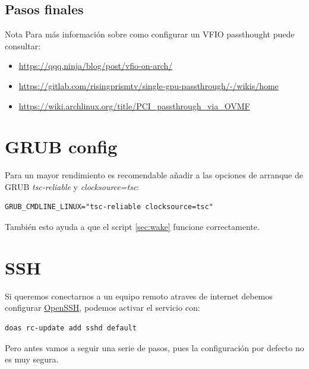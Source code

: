 \documentclass[12pt]{article}
\begin{document}
\subsection{Pasos finales}

\begin{mybox}{Nota}
	Para más información sobre como configurar un VFIO passthought puede consultar:
	\begin{itemize}
		\setlength\itemsep{0em}
		\item \href{https://qqq.ninja/blog/post/vfio-on-arch/}{https://qqq.ninja/blog/post/vfio-on-arch/}
		\item \href{https://gitlab.com/risingprismtv/single-gpu-passthrough/-/wikis/home}{https://gitlab.com/risingprismtv/single-gpu-passthrough/-/wikis/home}
		\item \href{https://wiki.archlinux.org/title/PCI\_passthrough\_via\_OVMF}{https://wiki.archlinux.org/title/PCI\_passthrough\_via\_OVMF}
	\end{itemize}
\end{mybox}

\section{GRUB config}

\label{sec:tsc}

Para un mayor rendimiento es recomendable añadir a las opciones de arranque de GRUB \emph{tsc-reliable} y \emph{clocksource=tsc}:

\begin{verbatim}
GRUB_CMDLINE_LINUX="tsc-reliable clocksource=tsc"
\end{verbatim}

También esto ayuda a que el script \ref{sec:wake} funcione correctamente.

\section{SSH}

Si queremos conectarnos a un equipo remoto atraves de internet debemos configurar \href{https://es.wikipedia.org/wiki/OpenSSH}{OpenSSH}, podemos activar el servicio con:

\begin{verbatim}
doas rc-update add sshd default
\end{verbatim}

Pero antes vamos a seguir una serie de pasos, pues la configuración por defecto no es muy segura.
\end{document}
